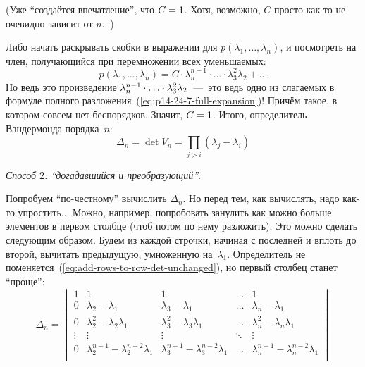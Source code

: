 \documentclass[a4paper,12pt]{article}
\theoremstyle{remark}
\begin{document}
\begin{solution}
    (Уже ``создаётся впечатление'', что $C \hm= 1$.
    Хотя, возможно, $C$ просто как-то не очевидно зависит от $n$...)
    
    Либо начать раскрывать скобки в выражении для $p(\lambda_1, \ldots, \lambda_n)$, и посмотреть на член, получающийся при перемножении всех уменьшаемых:
    \[
      p(\lambda_1, \ldots, \lambda_n) = C \cdot \lambda_n^{n-1} \cdot \ldots \cdot \lambda_3^2 \lambda_2 + \ldots
    \]
    Но ведь это произведение $\lambda_n^{n-1} \hm\cdot \ldots \hm\cdot \lambda_3^2 \lambda_2$~---~это ведь одно из слагаемых в формуле полного разложения~(\ref{eq:p14-24-7-full-expansion})!
    Причём такое, в котором совсем нет беспорядков.
    Значит, $C \hm= 1$.
    Итого, определитель Вандермонда порядка~$n$:
    \begin{equation}\label{eq:vander-de-mond}
      \Delta_n = \det V_n = \prod_{j > i} (\lambda_j - \lambda_i)
    \end{equation}
    
    \medskip
    
    \emph{Способ $2$: ``догадавшийся и преобразующий''}.
    
    Попробуем ``по-честному'' вычислить $\Delta_n$.
    Но перед тем, как вычислять, надо как-то упростить...
    Можно, например, попробовать занулить как можно больше элементов в первом столбце (чтоб потом по нему разложить).
    Это можно сделать следующим образом.
    Будем из каждой строчки, начиная с последней и вплоть до второй, вычитать предыдущую, умноженную на~$\lambda_1$.
    Определитель не поменяется~(\ref{eq:add-rows-to-row-det-unchanged}), но первый столбец станет ``проще'':
    \[
      \Delta_n
      = \begin{vmatrix}
        1      & 1                                           & 1                                           & \ldots & 1\\
        0      & \lambda_2 - \lambda_1                       & \lambda_3 - \lambda_1                       & \ldots & \lambda_n - \lambda_1\\
        0      & \lambda_2^2 - \lambda_2 \lambda_1           & \lambda_3^2 - \lambda_3 \lambda_1           & \ldots & \lambda_n^2 - \lambda_n \lambda_1\\
        \vdots & \vdots                                      & \vdots                                      & \ddots & \vdots\\
        0      & \lambda_2^{n-1} - \lambda_2^{n-2} \lambda_1 & \lambda_3^{n-1} - \lambda_3^{n-2} \lambda_1 & \ldots & \lambda_n^{n-1} - \lambda_n^{n-2} \lambda_1\\
      \end{vmatrix}
    \]
    

\end{solution}
\end{document}
